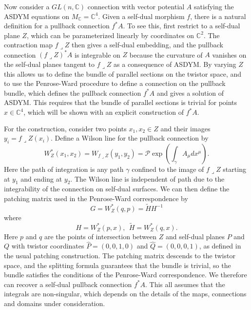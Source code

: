 \documentclass[12pt]{article}
\newcommand{\mbb}{\mathbb}
\newcommand{\pord}{W}
\begin{document}

Now consider a $GL(n,\mbb{C})$ connection with vector potential $A$ satisfying the ASDYM equations on $M_\mbb{C}=\mbb{C}^4$.  Given a self-dual morphism $f$, there is a natural definition for a pullback connection $f^*A$.  To see this, first restrict to a self-dual plane $Z$, which can be parameterized linearly by coordinates on $\mbb{C}^2$.  The contraction map $f\lrcorner Z$ then gives a self-dual embedding,  and the pullback connection $(f\lrcorner Z)^*A$ is integrable on $Z$ because the curvature of $A$ vanishes on the self-dual planes tangent to $f\lrcorner Z$ as a consequence of ASDYM.  By varying $Z$ this allows us to define the bundle of parallel sections on the twistor space, and to use the Penrose-Ward procedure to define a connection on the pullback bundle, which defines the pullback connection $f^* A$ and gives a solution of ASDYM.  This requires that the bundle of parallel sections is trivial for points $x\in\mbb{C}^4$, which will be shown with an explicit construction of $f^*A$. 

For the construction, consider two points $x_1,x_2\in Z$ and their images  $y_i=f\lrcorner Z(x_i)$.  Define a Wilson line for the pullback connection by
\begin{equation}
\pord^*_Z (x_1,x_2)=\pord_{f\lrcorner Z}(y_1,y_2)=\mathcal{P}\exp\left(\int_{\gamma}A_\mu d x^\mu\right).
\end{equation}
Here the path of integration is any path $\gamma$ confined to the image of $f\lrcorner Z$ starting at $y_1$ and ending at $y_2$.  The Wilson line is independent of path due to the integrability of the connection on self-dual surfaces.  We can then define the patching matrix used in the Penrose-Ward correspondence by 
\begin{equation}
G=\pord^*_Z(q,p)=\tilde{H}H^{-1}
\end{equation}
where
\begin{equation}\label{eq:hdef}
H=\pord^*_Z(p,x), \ \ \tilde{H}=\pord^*_Z(q,x). 
\end{equation}
Here $p$ and $q$ are the points of intersection between $Z$ and self-dual planes $P$ and $Q$ with twistor coordinates $\hat{P}=(0,0,1,0)$ and $\hat{Q}=(0,0,0,1)$, as defined in the usual patching construction.  The patching matrix descends to the twistor space, and the splitting formula guarantees that the bundle is trivial, so the bundle satisfies the conditions of the Penrose-Ward correspondence.  We therefore can recover a self-dual pullback connection $f^*A$. This all assumes that the integrals are non-singular, which depends on the details of the maps, connections and domains under consideration.
\end{document}
